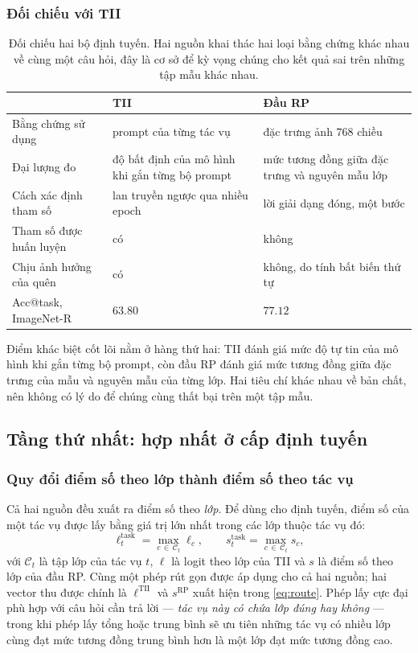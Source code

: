 \documentclass[11pt,a4paper]{article}
\begin{document}
\subsubsection{Đối chiếu với TII}
\begin{table}[htbp]
\centering
\caption{Đối chiếu hai bộ định tuyến. Hai nguồn khai thác hai loại bằng chứng
khác nhau về cùng một câu hỏi, đây là cơ sở để kỳ vọng chúng cho kết quả sai trên
những tập mẫu khác nhau.}
\label{tab:tii-vs-rp}
\begin{tabular}{@{}p{3.3cm}p{4.9cm}p{5.2cm}@{}}
\toprule
 & TII & Đầu RP \\
\midrule
Bằng chứng sử dụng
  & prompt của từng tác vụ
  & đặc trưng ảnh $768$ chiều \\
Đại lượng đo
  & độ bất định của mô hình khi gắn từng bộ prompt
  & mức tương đồng giữa đặc trưng và nguyên mẫu lớp \\
Cách xác định tham số
  & lan truyền ngược qua nhiều epoch
  & lời giải dạng đóng, một bước \\
Tham số được huấn luyện
  & có
  & không \\
Chịu ảnh hưởng của quên
  & có
  & không, do tính bất biến thứ tự \\
Acc@task, ImageNet-R
  & $63.80$
  & $77.12$ \\
\bottomrule
\end{tabular}
\end{table}

Điểm khác biệt cốt lõi nằm ở hàng thứ hai: TII đánh giá mức độ tự tin của mô hình
khi gắn từng bộ prompt, còn đầu RP đánh giá mức tương đồng giữa đặc trưng của mẫu
và nguyên mẫu của từng lớp. Hai tiêu chí khác nhau về bản chất, nên không có lý
do để chúng cùng thất bại trên một tập mẫu.

\subsection{Tầng thứ nhất: hợp nhất ở cấp định tuyến}
\label{sec:stage1}

\subsubsection{Quy đổi điểm số theo lớp thành điểm số theo tác vụ}

Cả hai nguồn đều xuất ra điểm số theo \emph{lớp}. Để dùng cho định tuyến, điểm số
của một tác vụ được lấy bằng giá trị lớn nhất trong các lớp thuộc tác vụ đó:
\begin{equation}
\ell^{\mathrm{task}}_t = \max_{c \,\in\, \mathcal{C}_t} \ell_c ,
\qquad
s^{\mathrm{task}}_t = \max_{c \,\in\, \mathcal{C}_t} s_c ,
\label{eq:taskscore}
\end{equation}
với $\mathcal{C}_t$ là tập lớp của tác vụ $t$, $\ell$ là logit theo lớp của TII
và $s$ là điểm số theo lớp của đầu RP. Cùng một phép rút gọn được áp dụng cho cả
hai nguồn; hai vector thu được chính là $\ell^{\mathrm{TII}}$ và
$s^{\mathrm{RP}}$ xuất hiện trong \eqref{eq:route}. Phép lấy cực đại phù hợp với câu
hỏi cần trả lời --- \emph{tác vụ này có chứa lớp đúng hay không} --- trong khi
phép lấy tổng hoặc trung bình sẽ ưu tiên những tác vụ có nhiều lớp cùng đạt mức
tương đồng trung bình hơn là một lớp đạt mức tương đồng cao.
\end{document}
